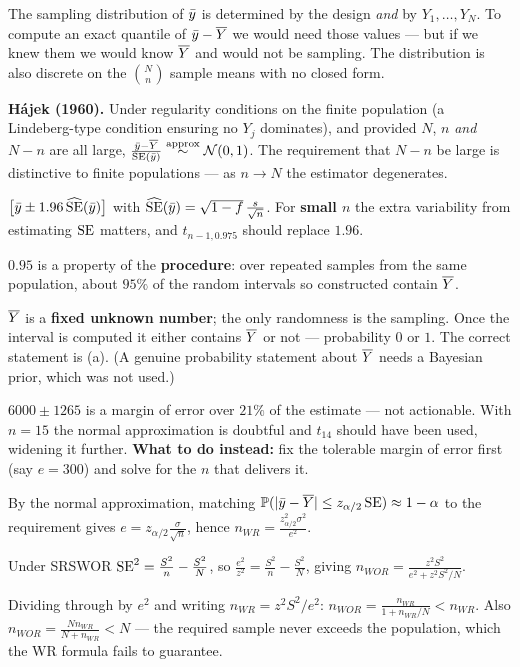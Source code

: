  The sampling distribution of $\bar{y}$ is determined by the design \emph{and} by
$Y_1,\dots,Y_N$. To compute an exact quantile of $\bar{y}-\overline{Y}$ we would need those values --- but
if we knew them we would know $\overline{Y}$ and would not be sampling. The distribution is also
discrete on the $\binom Nn$ sample means with no closed form.

 \textbf{H\'ajek (1960).} Under regularity conditions on the finite population (a
Lindeberg-type condition ensuring no $Y_j$ dominates), and provided $N$, $n$ \emph{and} $N-n$ are
all large, $\frac{\bar{y}-\overline{Y}}{\operatorname{SE}(\bar{y})}\overset{\text{approx}}{\sim}\mathcal{N}(0,1)$. The requirement
that $N-n$ be large is distinctive to finite populations --- as $n\to N$ the estimator degenerates.

 $\big[\bar{y}\pm1.96\,\widehat{\operatorname{SE}}(\bar{y})\big]$ with
$\widehat{\operatorname{SE}}(\bar{y})=\sqrt{1-f}\,\frac{s}{\sqrt n}$. For \textbf{small $n$} the extra variability from
estimating $\operatorname{SE}$ matters, and $t_{n-1,0.975}$ should replace $1.96$.

 $0.95$ is a property of the \textbf{procedure}: over repeated samples from the same
population, about $95\%$ of the random intervals so constructed contain $\overline{Y}$.

 $\overline{Y}$ is a \textbf{fixed unknown number}; the only randomness is the sampling. Once the
interval is computed it either contains $\overline{Y}$ or not --- probability $0$ or $1$. The correct
statement is (a). (A genuine probability statement about $\overline{Y}$ needs a Bayesian prior, which
was not used.)

 $6000\pm1265$ is a margin of error over $21\%$ of the estimate --- not actionable. With
$n=15$ the normal approximation is doubtful and $t_{14}$ should have been used, widening it
further. \textbf{What to do instead:} fix the tolerable margin of error first (say $e=300$) and
solve for the $n$ that delivers it.

 By the normal approximation, matching
$\mathbb{P}(|\bar{y}-\overline{Y}|\le z_{\alpha/2}\operatorname{SE})\approx1-\alpha$ to the requirement gives
$e=z_{\alpha/2}\frac{\sigma}{\sqrt n}$, hence $n_{WR}=\frac{z^2_{\alpha/2}\sigma^2}{e^2}$.

 Under SRSWOR $\operatorname{SE}^2=\frac{S^2}{n}-\frac{S^2}{N}$, so
$\frac{e^2}{z^2}=\frac{S^2}{n}-\frac{S^2}{N}$, giving
$n_{WOR}=\frac{z^2S^2}{e^2+z^2S^2/N}$.

 Dividing through by $e^2$ and writing $n_{WR}=z^2S^2/e^2$:
$n_{WOR}=\frac{n_{WR}}{1+n_{WR}/N}<n_{WR}$. Also
$n_{WOR}=\frac{Nn_{WR}}{N+n_{WR}}<N$ --- the required sample never exceeds the population, which
the WR formula fails to guarantee.

